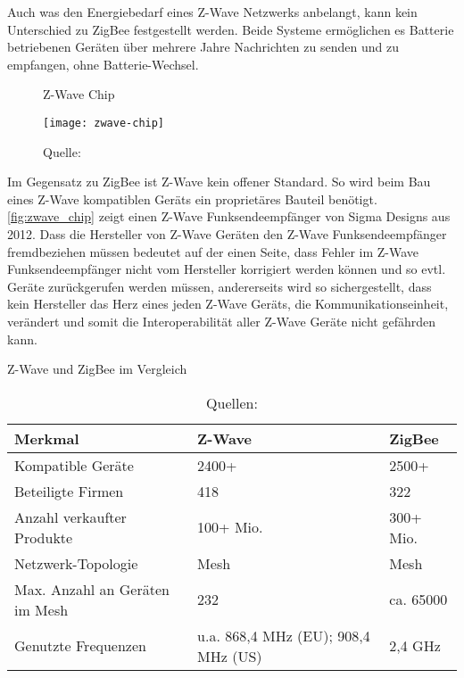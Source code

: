 Auch was den Energiebedarf eines Z-Wave Netzwerks anbelangt, kann kein Unterschied zu ZigBee festgestellt werden.
Beide Systeme ermöglichen es Batterie betriebenen Geräten über mehrere Jahre Nachrichten zu senden und zu empfangen, ohne Batterie-Wechsel.

\begin{wrapfigure}{r}{0.35\textwidth}
	\centering
	\caption{Z-Wave Chip}
	\texttt{[image: zwave-chip]}
	\caption*{\footnotesize{Quelle: }}
	\label{fig:zwave_chip}
\end{wrapfigure}

Im Gegensatz zu ZigBee ist Z-Wave kein offener Standard.
So wird beim Bau eines Z-Wave kompatiblen Geräts ein proprietäres Bauteil benötigt.
\autoref{fig:zwave_chip} zeigt einen Z-Wave Funksendeempfänger von Sigma Designs aus 2012.
Dass die Hersteller von Z-Wave Geräten den Z-Wave Funksendeempfänger fremdbeziehen müssen bedeutet auf der einen Seite, dass Fehler im Z-Wave Funksendeempfänger nicht vom Hersteller korrigiert werden können und so evtl. Geräte zurückgerufen werden müssen, andererseits wird so sichergestellt, dass kein Hersteller das Herz eines jeden Z-Wave Geräts, die Kommunikationseinheit, verändert und somit die Interoperabilität aller Z-Wave Geräte nicht gefährden kann.

\begin{table}[ht]
	\caption{Z-Wave und ZigBee im Vergleich}
	\centering
	\begin{tabular}{| p{} | p{} | p{} |}
		\hline
		\textbf{Merkmal} 	& \textbf{Z-Wave} & \textbf{ZigBee} \\ \hline
		Kompatible Geräte & 2400+ & 2500+ \\ \hline
		Beteiligte Firmen & 418 & 322 \\ \hline
		Anzahl verkaufter Produkte & 100+ Mio.& 300+ Mio.\\ \hline
		Netzwerk-Topologie & Mesh & Mesh \\ \hline
		Max. Anzahl an Geräten im Mesh & 232 & ca. 65000 \\ \hline
		Genutzte Frequenzen & u.a. 868,4 MHz (EU); 908,4 MHz (US) & 2,4 GHz \\ \hline
	\end{tabular}
	\caption*{\footnotesize{Quellen: }}
	\label{tab:zwave_vs_zigbee}
\end{table}


